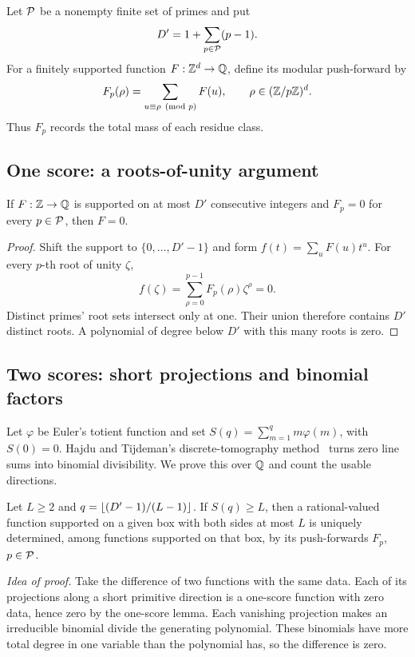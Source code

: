 Let \(\mathcal P\) be a nonempty finite set of primes and put
\[
 D'=1+\sum_{p\in\mathcal P}(p-1).
\]
For a finitely supported function \(F:\mathbb Z^d\to\mathbb Q\), define its
modular push-forward by
\[
 F_p(\rho)=\sum_{u\equiv\rho\pmod p}F(u),
 \qquad\rho\in(\mathbb Z/p\mathbb Z)^d.
\]
Thus \(F_p\) records the total mass of each residue class.

\subsection{One score: a roots-of-unity argument}

\begin{lemma}\label{earlier:g:lem:one-window}
If \(F:\mathbb Z\to\mathbb Q\) is supported on at most \(D'\) consecutive
integers and \(F_p=0\) for every \(p\in\mathcal P\), then \(F=0\).
\end{lemma}
\begin{proof}
Shift the support to \(\{0,\ldots,D'-1\}\) and form
\(f(t)=\sum_uF(u)t^u\). For every \(p\)-th root of unity \(\zeta\),
\[
 f(\zeta)=\sum_{\rho=0}^{p-1}F_p(\rho)\zeta^\rho=0.
\]
Distinct primes' root sets intersect only at one. Their union therefore
contains \(D'\) distinct roots. A polynomial of degree below \(D'\)
with this many roots is zero.
\end{proof}

\subsection{Two scores: short projections and binomial factors}

Let \(\varphi\) be Euler's totient function and set
\(S(q)=\sum_{m=1}^q m\varphi(m)\), with \(S(0)=0\).
Hajdu and Tijdeman's discrete-tomography method~\cite[Theorem~1 and
its preliminary divisibility lemma]{HT01} turns zero line sums into
binomial divisibility. We prove this over \(\mathbb Q\) and count the usable
directions.

\begin{lemma}\label{earlier:g:lem:two-window}
Let \(L\ge2\) and
\(q=\left\lfloor(D'-1)/(L-1)\right\rfloor\). If \(S(q)\ge L\), then a
rational-valued function supported on a given box with both sides at
most \(L\) is uniquely determined, among functions supported on that
box, by its push-forwards \(F_p\), \(p\in\mathcal P\).
\end{lemma}

\emph{Idea of proof.} Take the difference of two functions with the
same data. Each of its projections along a short primitive direction is
a one-score function with zero data, hence zero by the one-score lemma.
Each vanishing projection makes an irreducible binomial divide the
generating polynomial. These binomials have more total degree in one
variable than the polynomial has, so the difference is zero.

